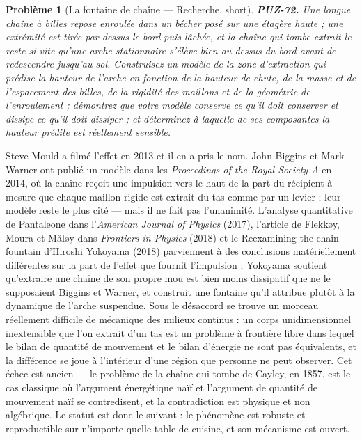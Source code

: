 \documentclass[11pt]{article}
\newtheorem{problem}{Problème}
\begin{document}
\bigskip

\begin{problem}[{La fontaine de chaîne --- Recherche, short}]
\textbf{PUZ-72.} Une longue chaîne à billes repose enroulée dans un bécher
posé sur une étagère haute ; une extrémité est tirée par-dessus le bord puis lâchée, et la
chaîne qui tombe extrait le reste si vite qu'une arche stationnaire s'élève bien au-dessus du
bord avant de redescendre jusqu'au sol. Construisez un modèle de la zone d'extraction qui
prédise la hauteur de l'arche en fonction de la hauteur de chute, de la masse et de
l'espacement des billes, de la rigidité des maillons et de la géométrie de l'enroulement ;
démontrez que votre modèle conserve ce qu'il doit conserver et dissipe ce qu'il doit dissiper ;
et déterminez à laquelle de ses composantes la hauteur prédite est réellement sensible.
\end{problem}

\noindent Steve Mould a filmé l'effet en 2013 et il en a pris le nom. John Biggins et
Mark Warner ont publié un modèle dans les \textit{Proceedings of the Royal Society A} en 2014,
où la chaîne reçoit une impulsion vers le haut de la part du récipient à mesure que chaque
maillon rigide est extrait du tas comme par un levier ; leur modèle reste le plus cité --- mais
il ne fait pas l'unanimité. L'analyse quantitative de Pantaleone dans l'\textit{American Journal
of Physics} (2017), l'article de Flekkøy, Moura et Måløy dans \textit{Frontiers in Physics}
(2018) et le \og{} Reexamining the chain fountain \fg{} d'Hiroshi Yokoyama (2018) parviennent à des
conclusions matériellement différentes sur la part de l'effet que fournit l'impulsion ;
Yokoyama soutient qu'extraire une chaîne de son propre mou est bien moins dissipatif que ne le
supposaient Biggins et Warner, et construit une fontaine qu'il attribue plutôt à la dynamique
de l'arche suspendue. Sous le désaccord se trouve un morceau réellement difficile de mécanique
des milieux continus : un corps unidimensionnel inextensible que l'on extrait d'un tas est un
problème à frontière libre dans lequel le bilan de quantité de mouvement et le bilan d'énergie
ne sont pas équivalents, et la différence se joue à l'intérieur d'une région que personne ne
peut observer. Cet échec est ancien --- le problème de la chaîne qui tombe de Cayley, en 1857,
est le cas classique où l'argument énergétique naïf et l'argument de quantité de mouvement
naïf se contredisent, et la contradiction est physique et non algébrique. Le statut est donc
le suivant : le phénomène est robuste et reproductible sur n'importe quelle table de cuisine,
et son mécanisme est ouvert.
\end{document}
